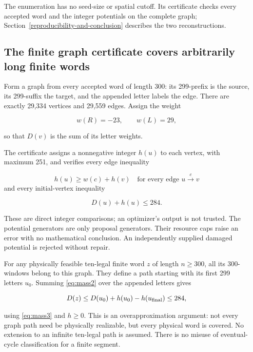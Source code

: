\documentclass[
  11pt,
]{article}
\begin{document}
The enumeration has no seed-size or spatial cutoff. Its certificate
checks every accepted word and the integer potentials on the complete graph;
Section~\ref{reproducibility-and-conclusion} describes the two reconstructions.

\subsection{The finite graph certificate covers arbitrarily long finite
words}\label{mass-3}

Form a graph from every accepted word of length 300: its 299-prefix is
the source, its 299-suffix the target, and the appended letter labels
the edge. There are exactly 29,334 vertices and 29,559 edges. Assign the
weight

\[
w(R)=-23,\qquad w(L)=29,
\]

so that $D(v)$ is the sum of its letter weights.

The certificate assigns a nonnegative integer $h(u)$ to each vertex, with
maximum 251, and verifies every edge inequality

\begin{equation}\label{eq:mass2}
h(u)\ge w(c)+h(v)\quad\text{for every edge }u\xrightarrow{c}v
\end{equation}
and every initial-vertex inequality

\begin{equation}\label{eq:mass3}
D(u)+h(u)\le284.
\end{equation}

These are direct integer comparisons; an optimizer's output is not
trusted. The potential generators are only proposal generators. Their
resource caps raise an error with no mathematical conclusion. An
independently supplied damaged potential is rejected without repair.

For any physically feasible ten-legal finite word $z$ of length
$n\ge300$, all its 300-windows belong to this graph. They define
a path starting with its first 299 letters $u_0$. Summing \eqref{eq:mass2} over the
appended letters gives

\[
D(z)\le D(u_0)+h(u_0)-h(u_{\rm final})\le284,
\]

using \eqref{eq:mass3} and $h\ge0$. This is an overapproximation
argument: not every graph path need be physically realizable, but every
physical word is covered. No extension to an infinite ten-legal path is
assumed. There is no misuse of eventual-cycle classification for a
finite segment.
\end{document}
